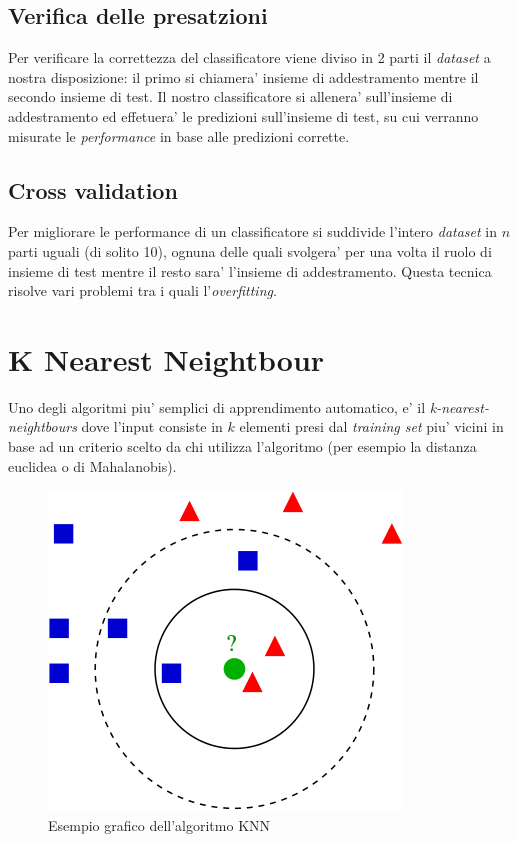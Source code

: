 \subsection*{Verifica delle presatzioni}
Per verificare la correttezza del classificatore viene diviso in 2 parti il \textit{dataset} a nostra disposizione: il primo si chiamera' insieme di addestramento mentre il secondo insieme di test. Il nostro classificatore si allenera' sull'insieme di addestramento ed effetuera' le predizioni sull'insieme di test, su cui verranno misurate le \textit{performance} in base alle predizioni corrette.


\subsection*{Cross validation}
Per migliorare le performance di un classificatore si suddivide l'intero \textit{dataset} in $n$ parti uguali (di solito 10), ognuna delle quali svolgera' per una volta il ruolo di insieme di test mentre il resto sara' l'insieme di addestramento. Questa tecnica risolve vari problemi tra i quali l'\textit{overfitting}.\\


\section*{K Nearest Neightbour}
Uno degli algoritmi piu' semplici di apprendimento automatico, e' il \textit{k-nearest-neightbours} dove l'input consiste in $k$ elementi presi dal \textit{training set} piu' vicini in base ad un criterio scelto da chi utilizza l'algoritmo (per esempio la distanza euclidea o di Mahalanobis).


\begin{figure}[H]
	\centering
	\includegraphics[width=0.7\linewidth]{img/knn_example}
	\caption{Esempio grafico dell'algoritmo KNN}
	\label{fig:knnexample}
\end{figure}


